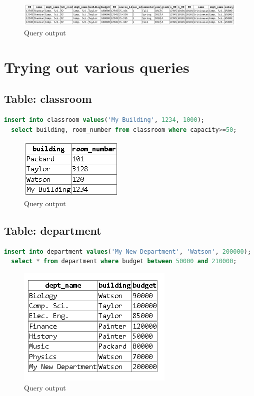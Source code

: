 \documentclass{article}
\begin{document}
\begin{figure}[!ht]
  \includegraphics[scale=0.61]{4.png}
  \caption{Query output}
\end{figure}




\section{Trying out various queries}

\subsection{Table: classroom}
\begin{lstlisting}[language=sql]
  insert into classroom values('My Building', 1234, 1000);
  select building, room_number from classroom where capacity>=50;
\end{lstlisting}
\begin{figure}[!ht]
  \begin{center}
  \includegraphics[scale=1]{class.png}
  \caption{Query output}
  \end{center}
\end{figure}

\subsection{Table: department}
\begin{lstlisting}[language=sql]
  insert into department values('My New Department', 'Watson', 200000);
  select * from department where budget between 50000 and 210000;
\end{lstlisting}
\begin{figure}[!ht]
  \begin{center}
  \includegraphics[scale=1]{dep.png}
  \caption{Query output}
  \end{center}
\end{figure}
\end{document}
